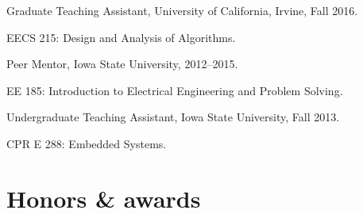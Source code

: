 \documentclass[11pt,article,oneside]{memoir}
\begin{document}
\bigskip

{}

\ind Graduate Teaching Assistant, University of California, Irvine, Fall 2016.

\ind \hspace{0.35in} \footnotesize EECS 215: Design and Analysis of Algorithms.
\normalsize \vspace{0.05in}

\ind Peer Mentor, Iowa State University, 2012--2015.

\ind \hspace{0.35in} \footnotesize EE 185: Introduction to Electrical Engineering and Problem Solving.
\normalsize \vspace{0.05in}

\ind Undergraduate Teaching Assistant, Iowa State University, Fall 2013.

\ind \hspace{0.35in} \footnotesize CPR E 288: Embedded Systems.
\normalsize \vspace{0.05in}

\bigskip

\section{Honors \& awards}

\end{document}
